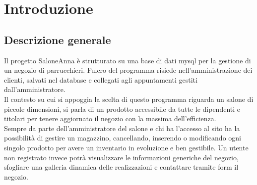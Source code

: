 
\section{Introduzione}
\subsection{Descrizione generale}
Il progetto SaloneAnna è strutturato su una base di dati mysql per la gestione di un negozio di parrucchieri. Fulcro del programma risiede nell'amministrazione dei clienti, salvati nel database e collegati agli appuntamenti gestiti dall'amministratore.\\
Il contesto su cui si appoggia la scelta di questo programma riguarda un salone di piccole dimensioni, si parla di un prodotto accessibile da tutte le dipendenti e titolari per tenere aggiornato il negozio con la massima dell'efficienza.\\
Sempre da parte dell'amministratore del salone e chi ha l'accesso al sito ha la possibilità di gestire un magazzino, cancellando, inserendo o modificando ogni singolo prodotto per avere un inventario in evoluzione e ben gestibile. Un utente non registrato invece potrà visualizzare le informazioni generiche del negozio, sfogliare una galleria dinamica delle realizzazioni e contattare tramite form il negozio.\\
